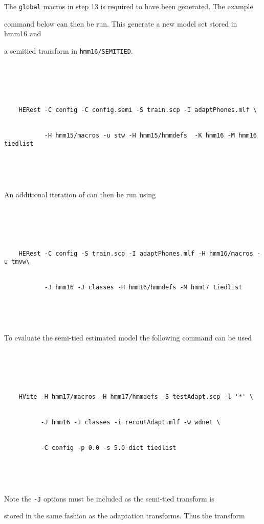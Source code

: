 The \texttt{global} macros in step 13 is required to have been generated. The example


command below can then be run. This generate a new model set stored in hmm16 and 


a semitied transform in \texttt{hmm16/SEMITIED}.


\begin{verbatim}





    HERest -C config -C config.semi -S train.scp -I adaptPhones.mlf \


           -H hmm15/macros -u stw -H hmm15/hmmdefs  -K hmm16 -M hmm16 tiedlist





\end{verbatim}


An additional iteration of  can then be run using


\begin{verbatim}





    HERest -C config -S train.scp -I adaptPhones.mlf -H hmm16/macros -u tmvw\


           -J hmm16 -J classes -H hmm16/hmmdefs -M hmm17 tiedlist





\end{verbatim}


To evaluate the semi-tied estimated model the following command can be used


\begin{verbatim}





    HVite -H hmm17/macros -H hmm17/hmmdefs -S testAdapt.scp -l '*' \ 


          -J hmm16 -J classes -i recoutAdapt.mlf -w wdnet \ 


          -C config -p 0.0 -s 5.0 dict tiedlist





\end{verbatim}


Note the {\tt -J} options must be included as the semi-tied transform is


stored in the same fashion as the adaptation transforms. Thus the transform


